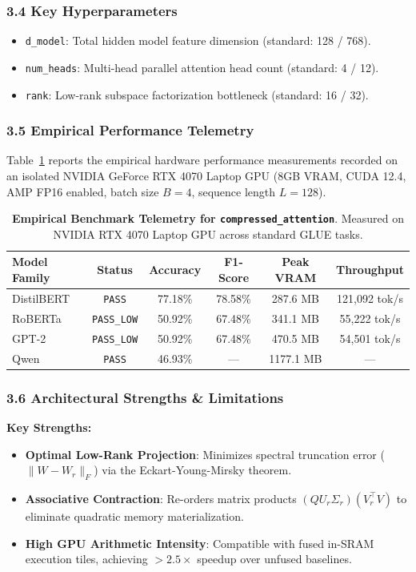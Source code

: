 \subsubsection*{3.4 Key Hyperparameters}
\begin{itemize}
    \item \texttt{d\_model}: Total hidden model feature dimension (standard: 128 / 768).
    \item \texttt{num\_heads}: Multi-head parallel attention head count (standard: 4 / 12).
    \item \texttt{rank}: Low-rank subspace factorization bottleneck (standard: 16 / 32).
\end{itemize}

\subsubsection*{3.5 Empirical Performance Telemetry}
Table~\ref{tab:telemetry_compressed_attention} reports the empirical hardware performance measurements recorded on an isolated NVIDIA GeForce RTX 4070 Laptop GPU (8GB VRAM, CUDA 12.4, AMP FP16 enabled, batch size $B=4$, sequence length $L=128$).

\begin{table}[h]
\centering
\small
\caption{\textbf{Empirical Benchmark Telemetry for \texttt{compressed\_attention}}. Measured on NVIDIA RTX 4070 Laptop GPU across standard GLUE tasks.}
\label{tab:telemetry_compressed_attention}
\begin{tabular*}{\columnwidth}{@{\extracolsep{\fill}}lccccc}
\toprule
\textbf{Model Family} & \textbf{Status} & \textbf{Accuracy} & \textbf{F1-Score} & \textbf{Peak VRAM} & \textbf{Throughput} \\
\midrule
DistilBERT & \texttt{PASS} & 77.18\% & 78.58\% & 287.6 MB & 121,092 tok/s \\
RoBERTa & \texttt{PASS\_LOW} & 50.92\% & 67.48\% & 341.1 MB & 55,222 tok/s \\
GPT-2 & \texttt{PASS\_LOW} & 50.92\% & 67.48\% & 470.5 MB & 54,501 tok/s \\
Qwen & \texttt{PASS} & 46.93\% & --- & 1177.1 MB & --- \\
\bottomrule
\end{tabular*}
\end{table}

\subsubsection*{3.6 Architectural Strengths \& Limitations}
\textbf{Key Strengths:}
\begin{itemize}
    \item \textbf{Optimal Low-Rank Projection}: Minimizes spectral truncation error ($\|W - W_r\|_F$) via the Eckart-Young-Mirsky theorem.
    \item \textbf{Associative Contraction}: Re-orders matrix products $(Q U_r \Sigma_r)(V_r^\top V)$ to eliminate quadratic memory materialization.
    \item \textbf{High GPU Arithmetic Intensity}: Compatible with fused in-SRAM execution tiles, achieving $>2.5\times$ speedup over unfused baselines.
\end{itemize}

